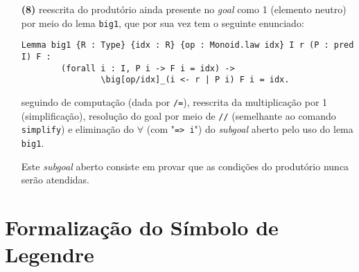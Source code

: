 \begin{enumerate}[label=\textbf{\roman*.}]
\begin{enumerate}
                \item[\textbf{(8)}] reescrita do produtório ainda presente no \textit{goal} como 1 (elemento neutro) por meio do lema \lstinline[language=coq]|big1|, que por sua vez tem o seguinte enunciado:
                        \begin{lstlisting}[language=coq,frame=single,tabsize=1]
Lemma big1 {R : Type} {idx : R} {op : Monoid.law idx} I r (P : pred I) F :
        (forall i : I, P i -> F i = idx) -> 
                \big[op/idx]_(i <- r | P i) F i = idx.
                        \end{lstlisting}
                seguindo de computação (dada por \lstinline[language=coq]|/=|), reescrita da multiplicação por 1 (simplificação), resolução do goal por meio de \lstinline[language=coq]|//| (semelhante ao comando \lstinline[language=coq]|simplify|) e eliminação do $\forall$ (com "\lstinline[language=coq]|=> i|") do \textit{subgoal} aberto pelo uso do lema \lstinline[language=coq]|big1|.

                Este \textit{subgoal} aberto consiste em provar que as condições do produtório nunca serão atendidas.
        \end{enumerate}

\end{enumerate}


\section{Formalização do Símbolo de Legendre}

